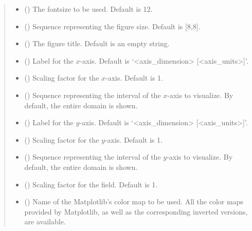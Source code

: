 \documentclass[letterpaper,10pt,english]{sphinxmanual}
\begin{document}
\begin{fulllineitems}
\begin{quote}
\begin{description}
\begin{itemize}
\item {} 
 () \textendash{} The fontsize to be used. Default is 12.

\item {} 
 () \textendash{} Sequence representing the figure size. Default is {[}8,8{]}.

\item {} 
 () \textendash{} The figure title. Default is an empty string.

\item {} 
 () \textendash{} Label for the \(x\)-axis. Default is ‘\textless{}axis\_dimension\textgreater{} {[}\textless{}axis\_units\textgreater{}{]}’.

\item {} 
 () \textendash{} Scaling factor for the \(x\)-axis. Default is 1.

\item {} 
 () \textendash{} Sequence representing the interval of the \(x\)-axis to visualize. By default, the entire domain is shown.

\item {} 
 () \textendash{} Label for the \(y\)-axis. Default is ‘\textless{}axis\_dimension\textgreater{} {[}\textless{}axis\_units\textgreater{}{]}’.

\item {} 
 () \textendash{} Scaling factor for the \(y\)-axis. Default is 1.

\item {} 
 () \textendash{} Sequence representing the interval of the \(y\)-axis to visualize. By default, the entire domain is shown.

\item {} 
 () \textendash{} Scaling factor for the field. Default is 1.

\item {} 
 () \textendash{} Name of the Matplotlib’s color map to be used. All the color maps provided by Matplotlib, as well as the corresponding inverted
versions, are available.


\end{itemize}
\end{description}
\end{quote}
\end{fulllineitems}
\end{document}
